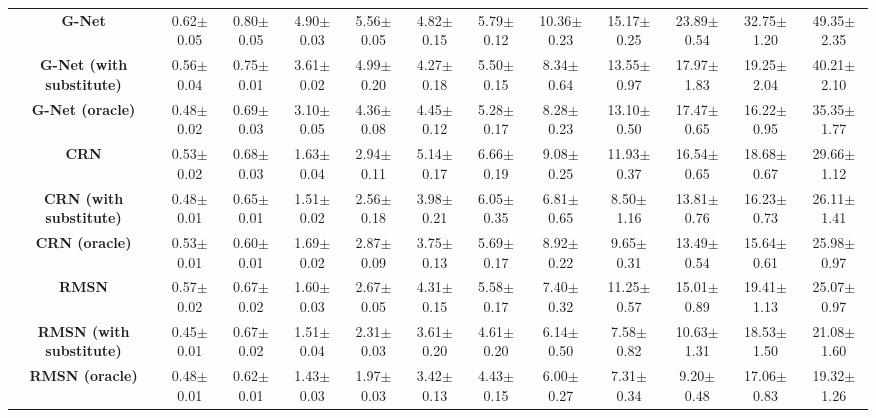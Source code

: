 \documentclass[11pt]{article}
\begin{document}
\begin{table}[htbp]
{\begin{tabular}{|c|c|c|c|c|c|c|c|c|c|c|c|}
 \hline
\textbf{G-Net} & 0.62$\pm$0.05&  0.80$\pm$0.05& 4.90$\pm$0.03& 5.56$\pm$0.05& 4.82$\pm$0.15& 5.79$\pm$0.12& 10.36$\pm$0.23& 15.17$\pm$0.25& 23.89$\pm$0.54& 32.75$\pm$1.20& 49.35$\pm$2.35\\

\textbf{G-Net (with substitute)} & 0.56$\pm$0.04&  0.75$\pm$0.01& 3.61$\pm$0.02& 4.99$\pm$0.20& 4.27$\pm$0.18& 5.50$\pm$0.15& 8.34$\pm$0.64& 13.55$\pm$0.97& 17.97$\pm$1.83& 19.25$\pm$2.04& 40.21$\pm$2.10\\

\textbf{G-Net (oracle)} & 0.48$\pm$0.02& 0.69$\pm$0.03& 3.10$\pm$0.05& 4.36$\pm$0.08& 4.45$\pm$0.12& 5.28$\pm$0.17& 8.28$\pm$0.23& 13.10$\pm$0.50& 17.47$\pm$0.65& 16.22$\pm$0.95& 35.35$\pm$1.77\\
 \hline

 
\textbf{CRN} & 0.53$\pm$0.02& 0.68$\pm$0.03& 1.63$\pm$0.04& 2.94$\pm$0.11& 5.14$\pm$0.17& 6.66$\pm$0.19& 9.08$\pm$0.25& 11.93$\pm$0.37& 16.54$\pm$0.65& 18.68$\pm$0.67& 29.66$\pm$1.12\\

\textbf{CRN (with substitute)} & 0.48$\pm$0.01& 0.65$\pm$0.01& 1.51$\pm$0.02& 2.56$\pm$0.18 & 3.98$\pm$0.21 & 6.05$\pm$0.35 & 6.81$\pm$0.65 & 8.50$\pm$1.16 & 13.81$\pm$0.76 & 16.23$\pm$0.73 & 26.11$\pm$1.41 \\

\textbf{CRN (oracle)} & 0.53$\pm$0.01& 0.60$\pm$0.01& 1.69$\pm$0.02& 2.87$\pm$0.09& 3.75$\pm$0.13& 5.69$\pm$0.17& 8.92$\pm$0.22& 9.65$\pm$0.31& 13.49$\pm$0.54& 15.64$\pm$0.61& 25.98$\pm$0.97\\

 \hline
\textbf{RMSN} & 0.57$\pm$0.02& 0.67$\pm$0.02& 1.60$\pm$0.03& 2.67$\pm$0.05& 4.31$\pm$0.15& 5.58$\pm$0.17& 7.40$\pm$0.32& 11.25$\pm$0.57& 15.01$\pm$0.89& 19.41$\pm$1.13& 25.07$\pm$0.97\\

\textbf{RMSN (with substitute)} & 0.45$\pm$0.01& 0.67$\pm$0.02& 1.51$\pm$0.04 & 2.31$\pm$0.03& 3.61$\pm$0.20& 4.61$\pm$0.20& 6.14$\pm$0.50& 7.58$\pm$0.82& 10.63$\pm$1.31& 18.53$\pm$1.50& 21.08$\pm$1.60\\

\textbf{RMSN (oracle)} & 0.48$\pm$0.01& 0.62$\pm$0.01& 1.43$\pm$0.03& 1.97$\pm$0.03& 3.42$\pm$0.13& 4.43$\pm$0.15& 6.00$\pm$0.27& 7.31$\pm$0.34& 9.20$\pm$0.48& 17.06$\pm$0.83& 19.32$\pm$1.26\\
 \hline
 \end{tabular}
}
\end{table}
\end{document}
